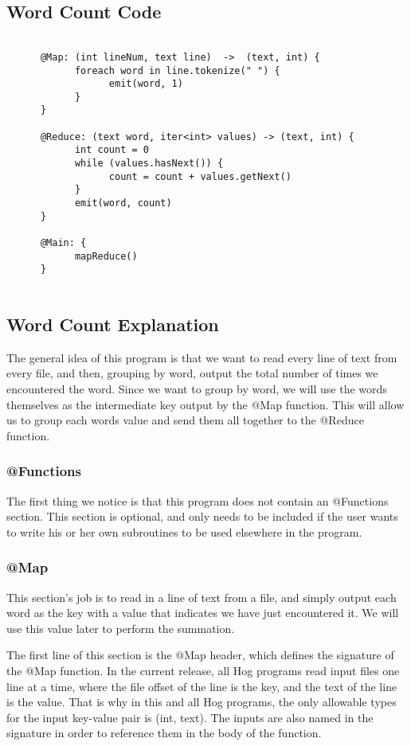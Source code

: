 \documentclass{article}
\begin{document}
\subsection*{Word Count Code}
\begin{verbatim}
      
      @Map: (int lineNum, text line)  ->  (text, int) {
            foreach word in line.tokenize(" ") {
                  emit(word, 1)
            }
      }
      
      @Reduce: (text word, iter<int> values) -> (text, int) {
            int count = 0
            while (values.hasNext()) {
                  count = count + values.getNext()
            }
            emit(word, count)
      }
      
      @Main: {
            mapReduce()
      }
      
\end{verbatim}

\subsection*{Word Count Explanation}
The general idea of this program is that we want to read every line of text from every file, and then, grouping by word, output the total number of times we encountered the word. Since we want to group by word, we will use the words themselves as the intermediate key output by the @Map function. This will allow us to group each words value and send them all together to the @Reduce function.

\subsubsection*{@Functions}
The first thing we notice is that this program does not contain an @Functions section. This section is optional, and only needs to be included if the user wants to write his or her own subroutines to be used elsewhere in the program.

\subsubsection*{@Map}
This section's job is to read in a line of text from a file, and simply output each word as the key with a value that indicates we have just encountered it. We will use this value later to perform the summation.

The first line of this section is the @Map header, which defines the signature of the @Map function. In the current release, all Hog programs read input files one line at a time, where the file offset of the line is the key, and the text of the line is the value. That is why in this and all Hog programs, the only allowable types for the input key-value pair is (int, text). The inputs are also named in the signature in order to reference them in the body of the function.
\end{document}
